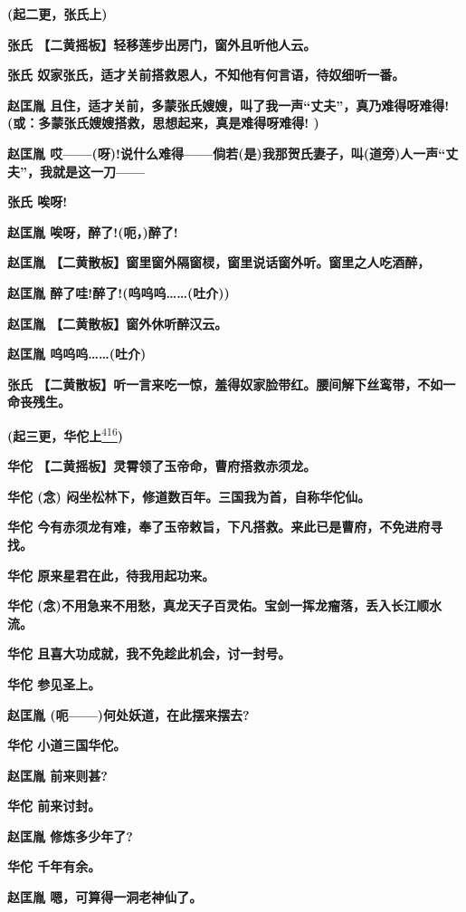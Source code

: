 \textbf{(起二更，张氏上)}

\textbf{张氏 【二黄摇板】轻移莲步出房门，窗外且听他人云。}

\textbf{张氏 奴家张氏，适才关前搭救恩人，不知他有何言语，待奴细听一番。}

\textbf{赵匡胤
且住，适才关前，多蒙张氏嫂嫂，叫了我一声``丈夫''，真乃难得呀难得!(或：多蒙张氏嫂嫂搭救，思想起来，真是难得呀难得!
)}

\textbf{赵匡胤
哎------(呀)!说什么难得------倘若(是)我那贺氏妻子，叫(道旁)人一声``丈夫''，我就是这一刀------}

\textbf{张氏 唉呀!}

\textbf{赵匡胤 唉呀，醉了!(呃，)醉了!}

\textbf{赵匡胤
【二黄散板】窗里窗外隔窗棂，窗里说话窗外听。窗里之人吃酒醉，}

\textbf{赵匡胤 醉了哇!醉了!(呜呜呜\ldots{}\ldots{}(吐介))}

\textbf{赵匡胤 【二黄散板】窗外休听醉汉云。}

\textbf{赵匡胤 呜呜呜\ldots{}\ldots{}(吐介)}

\textbf{张氏
【二黄散板】听一言来吃一惊，羞得奴家脸带红。腰间解下丝鸾带，不如一命丧残生。}

\textbf{(起三更，华佗上}\protect\hyperlink{fn416}{\textsuperscript{416}}\textbf{)}

\textbf{华佗 【二黄摇板】灵霄领了玉帝命，曹府搭救赤须龙。}

\textbf{华佗 (念) 闷坐松林下，修道数百年。三国我为首，自称华佗仙。}

\textbf{华佗
今有赤须龙有难，奉了玉帝敕旨，下凡搭救。来此已是曹府，不免进府寻找。}

\textbf{华佗 原来星君在此，待我用起功来。}

\textbf{华佗
(念)不用急来不用愁，真龙天子百灵佑。宝剑一挥龙瘤落，丢入长江顺水流。}

\textbf{华佗 且喜大功成就，我不免趁此机会，讨一封号。}

\textbf{华佗 参见圣上。}

\textbf{赵匡胤 (呃------)何处妖道，在此摆来摆去?}

\textbf{华佗 小道三国华佗。}

\textbf{赵匡胤 前来则甚?}

\textbf{华佗 前来讨封。}

\textbf{赵匡胤 修炼多少年了?}

\textbf{华佗 千年有余。}

\textbf{赵匡胤 嗯，可算得一洞老神仙了。}

